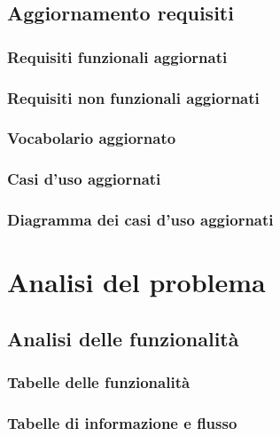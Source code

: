 \documentclass{article}
\begin{document}
\subsection{Aggiornamento requisiti}
\subsubsection{Requisiti funzionali aggiornati}

\subsubsection{Requisiti non funzionali aggiornati}

\subsubsection{Vocabolario aggiornato}

\subsubsection{Casi d'uso aggiornati}

\subsubsection{Diagramma dei casi d'uso aggiornati}



\section{Analisi del problema}
\subsection{Analisi delle funzionalità}
\subsubsection{Tabelle delle funzionalità}

\subsubsection{Tabelle di informazione e flusso}

\end{document}
